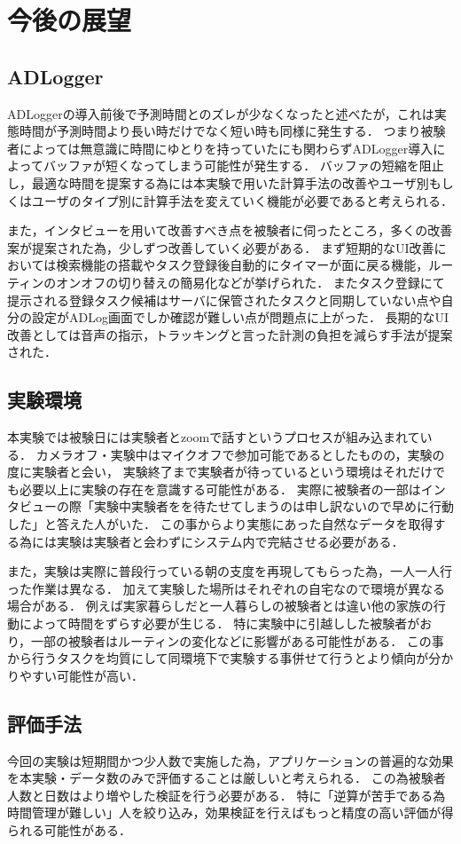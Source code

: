 \section{今後の展望}
\subsection{ADLogger}
ADLoggerの導入前後で予測時間とのズレが少なくなったと述べたが，これは実態時間が予測時間より長い時だけでなく短い時も同様に発生する．
つまり被験者によっては無意識に時間にゆとりを持っていたにも関わらずADLogger導入によってバッファが短くなってしまう可能性が発生する．
バッファの短縮を阻止し，最適な時間を提案する為には本実験で用いた計算手法の改善やユーザ別もしくはユーザのタイプ別に計算手法を変えていく機能が必要であると考えられる．

また，インタビューを用いて改善すべき点を被験者に伺ったところ，多くの改善案が提案された為，少しずつ改善していく必要がある．
まず短期的なUI改善においては検索機能の搭載やタスク登録後自動的にタイマーが面に戻る機能，ルーティンのオンオフの切り替えの簡易化などが挙げられた．
またタスク登録にて提示される登録タスク候補はサーバに保管されたタスクと同期していない点や自分の設定がADLog画面でしか確認が難しい点が問題点に上がった．
長期的なUI改善としては音声の指示，トラッキングと言った計測の負担を減らす手法が提案された．

\subsection{実験環境}
本実験では被験日には実験者とzoomで話すというプロセスが組み込まれている．
カメラオフ・実験中はマイクオフで参加可能であるとしたものの，実験の度に実験者と会い，
実験終了まで実験者が待っているという環境はそれだけでも必要以上に実験の存在を意識する可能性がある．
実際に被験者の一部はインタビューの際「実験中実験者をを待たせてしまうのは申し訳ないので早めに行動した」と答えた人がいた．
この事からより実態にあった自然なデータを取得する為には実験は実験者と会わずにシステム内で完結させる必要がある．

また，実験は実際に普段行っている朝の支度を再現してもらった為，一人一人行った作業は異なる．
加えて実験した場所はそれぞれの自宅なので環境が異なる場合がある．
例えば実家暮らしだと一人暮らしの被験者とは違い他の家族の行動によって時間をずらす必要が生じる．
特に実験中に引越しした被験者がおり，一部の被験者はルーティンの変化などに影響がある可能性がある．
この事から行うタスクを均質にして同環境下で実験する事併せて行うとより傾向が分かりやすい可能性が高い．

\subsection{評価手法}
今回の実験は短期間かつ少人数で実施した為，アプリケーションの普遍的な効果を本実験・データ数のみで評価することは厳しいと考えられる．
この為被験者人数と日数はより増やした検証を行う必要がある．
特に「逆算が苦手である為時間管理が難しい」人を絞り込み，効果検証を行えばもっと精度の高い評価が得られる可能性がある．

